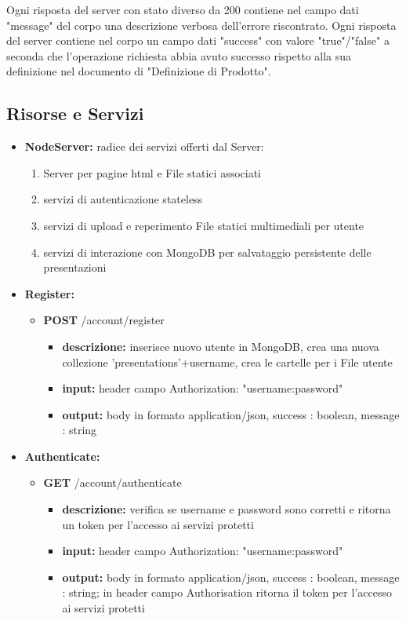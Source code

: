 {	Ogni risposta del server con stato diverso da 200 contiene nel campo dati "message" del corpo una descrizione verbosa dell'errore riscontrato.
	Ogni risposta del server contiene nel corpo un campo dati "success" con valore "true"/"false" a seconda che l'operazione richiesta abbia avuto successo rispetto alla sua definizione nel documento di "Definizione di Prodotto".
	
	\subsection{Risorse e Servizi}{
	
	\begin{itemize}
			
		\item \textbf{NodeServer:} radice dei servizi offerti dal Server:
			\begin{enumerate}
				\item Server per pagine html e File statici associati
				\item servizi di autenticazione stateless
				\item servizi di upload e reperimento File statici multimediali per utente
				\item servizi di interazione con MongoDB per salvataggio persistente delle presentazioni
			\end{enumerate}	
				
		\item \textbf{Register:}
			\begin{itemize}
			\item  \textbf{POST} /account/register 
				\begin{itemize} 
				\item \textbf{descrizione:} inserisce nuovo utente in MongoDB, crea una nuova collezione 'presentations'+username, crea le cartelle per i File utente
				\item \textbf{input:} header campo Authorization: "username:password"
				\item \textbf{output:} body in formato application/json, success : boolean, message : string
				\end{itemize}
			\end{itemize}
			
		\item \textbf{Authenticate:}
			\begin{itemize}
			\item  \textbf{GET} /account/authenticate 
				\begin{itemize} 
				\item \textbf{descrizione:} verifica se username e password sono corretti e ritorna un token per l'accesso ai servizi protetti
				\item \textbf{input:} header campo Authorization: "username:password"
				\item \textbf{output:}  body in formato application/json, success : boolean, message : string; in header campo Authorisation ritorna il token per l'accesso ai servizi protetti 
				\end{itemize}
			\end{itemize}
				

\end{itemize}}}
